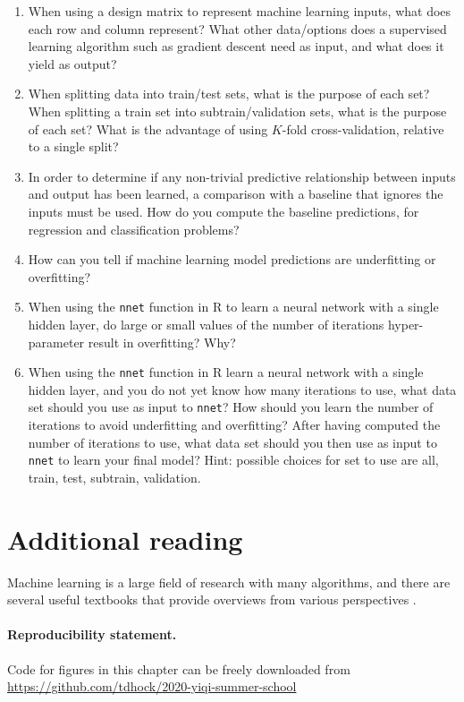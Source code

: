 \documentclass[12pt]{article}
\begin{document}
\begin{enumerate}
\item When using a design matrix to represent machine learning inputs,
  what does each row and column represent? What other data/options
  does a supervised learning algorithm such as gradient descent need
  as input, and what does it yield as output?
\item When splitting data into train/test sets, what is the purpose of
  each set? When splitting a train set into subtrain/validation sets,
  what is the purpose of each set? What is the advantage of using
  $K$-fold cross-validation, relative to a single split?
\item In order to determine if any non-trivial predictive relationship
  between inputs and output has been learned, a comparison with a
  baseline that ignores the inputs must be used. How do you compute
  the baseline predictions, for regression and classification
  problems?
\item How can you tell if machine learning model predictions are
  underfitting or overfitting?
\item When using the \texttt{nnet} function in R to learn a
  neural network with a single hidden layer, do large or small values
  of the number of iterations hyper-parameter result in overfitting? Why?
\item When using the \texttt{nnet} function in R learn a neural
  network with a single hidden layer, and you do not yet know how many
  iterations to use, what data set should you use as input to
  \texttt{nnet}? How should you learn the number of iterations to
  avoid underfitting and overfitting? After having computed the number
  of iterations to use, what data set should you then use as input to
  \texttt{nnet} to learn your final model? Hint: possible choices for
  set to use are all, train, test, subtrain, validation.
\end{enumerate}

\section{Additional reading}

Machine learning is a large field of research with many algorithms,
and there are several useful textbooks that provide overviews from
various perspectives \citep{Bishop2006, Hastie2009, Wasserman2010,
  Murphy2013, Goodfellow2016}.

\paragraph{Reproducibility statement.} Code for figures in this
chapter can be freely downloaded from
\url{https://github.com/tdhock/2020-yiqi-summer-school}


 
\end{document}
